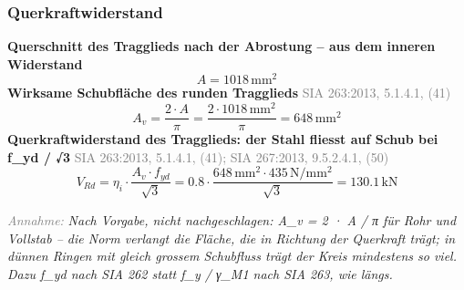 \documentclass[11pt,a4paper]{article}
\newcommand{\normref}[1]{{\small\textcolor{gray}{#1}}}
\newcommand{\hinweis}[2]{\par\noindent\textcolor{gray}{\textit{#1:}} \textit{#2}\par}
\begin{document}
\subsubsection{Querkraftwiderstand}
\noindent\textbf{Querschnitt des Tragglieds nach der Abrostung -- aus dem inneren Widerstand}
\begin{equation*}
A = 1018\,\mathrm{mm}^{2}
\end{equation*}
\noindent\textbf{Wirksame Schubfläche des runden Tragglieds} \hfill \normref{SIA 263:2013, 5.1.4.1, (41)}
\begin{equation*}
A_v = \frac{2 \cdot A}{\pi} = \frac{2 \cdot 1018\,\mathrm{mm}^{2}}{\pi} = 648\,\mathrm{mm}^{2}
\end{equation*}
\noindent\textbf{Querkraftwiderstand des Tragglieds: der Stahl fliesst auf Schub bei f\_yd / √3} \hfill \normref{SIA 263:2013, 5.1.4.1, (41); SIA 267:2013, 9.5.2.4.1, (50)}
\begin{equation*}
V_{Rd} = \eta_i \cdot \frac{A_v \cdot f_{yd}}{\sqrt{3}} = 0.8 \cdot \frac{648\,\mathrm{mm}^{2} \cdot 435\,\mathrm{N}/\mathrm{mm}^{2}}{\sqrt{3}} = 130.1\,\mathrm{kN}
\end{equation*}
\hinweis{Annahme}{Nach Vorgabe, nicht nachgeschlagen: A\_v = 2 · A / π für Rohr und Vollstab -- die Norm verlangt die Fläche, die in Richtung der Querkraft trägt; in dünnen Ringen mit gleich grossem Schubfluss trägt der Kreis mindestens so viel. Dazu f\_yd nach SIA 262 statt f\_y / γ\_M1 nach SIA 263, wie längs.}
\end{document}

